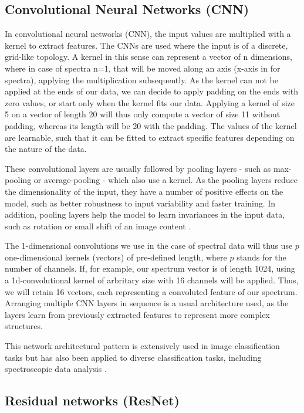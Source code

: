 \subsection{Convolutional Neural Networks (CNN)}
In convolutional neural networks (CNN), the input values are multiplied with a kernel to extract features. The CNNs are used where the input is of a discrete, grid-like topology. A kernel in this sense can represent a vector of n dimensions, where in case of spectra n=1, that will be moved along an axis (x-axis in for spectra), applying the multiplication subsequently. As the kernel can not be applied at the ends of our data, we can decide to apply padding on the ends with zero values, or start only when the kernel fits our data. Applying a kernel of size 5 on a vector of length 20 will thus only compute a vector of size 11 without padding, whereas its length will be 20 with the padding.
The values of the kernel are learnable, such that it can be fitted to extract specific features depending on the nature of the data.

These convolutional layers are usually followed by pooling layers - such as max-pooling or average-pooling - which also use a kernel. As the pooling layers reduce the dimensionality of the input, they have a number of positive effects on the model, such as better robustness to input variability and faster training. In addition, pooling layers help the model to learn invariances in the input data, such as rotation or small shift of an image content \cite{goodfellow_deep_2016}. 

The 1-dimensional convolutions we use in the case of spectral data will thus use $p$ one-dimensional kernels (vectors) of pre-defined length, where $p$ stands for the number of channels. If, for example, our spectrum vector is of length 1024, using a 1d-convolutional kernel of arbritary size with 16 channels will be applied. Thus, we will retain 16 vectors, each representing a convoluted feature of our spectrum. Arranging multiple CNN layers in sequence is a usual architecture used, as the layers learn from previously extracted features to represent more complex structures.

This network architectural pattern is extensively used in image classification tasks but has also been applied to diverse classification tasks, including spectroscopic data analysis \cite{sun_cnnlstm_2023, castorena_deep_2021, drera_deep_2019}.

\subsection{Residual networks (ResNet)}

